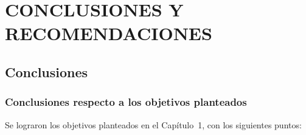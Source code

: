 
\chapter{CONCLUSIONES Y RECOMENDACIONES}

\section{Conclusiones}

\subsection{Conclusiones respecto a los objetivos planteados}

Se lograron los objetivos planteados en el Capítulo~1, con los siguientes puntos:

